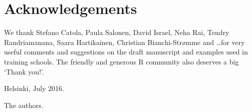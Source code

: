 \section{Acknowledgements}

We thank Stefano Catola, Paula Salonen, David Israel, Neha Rai, Tendry Randriamanana, Saara Hartikainen, Christian Bianchi-Str{\o}mme and \ldots for very useful comments and suggestions on the draft manuscript and examples used in training schools. The friendly and generous R community also deserves a big `Thank you!'.

Helsinki, July 2016.

The authors. 